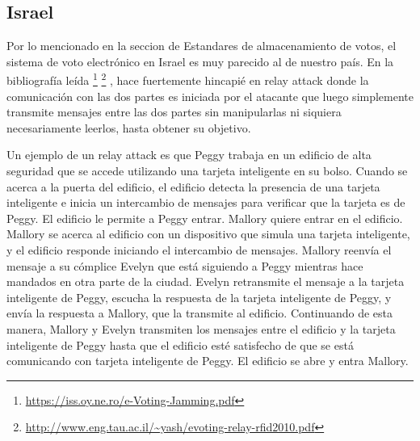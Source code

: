 \subsection{Israel}
Por lo mencionado en la seccion de Estandares de almacenamiento de votos, el sistema de voto electrónico en Israel es muy parecido al de nuestro país. 
En la bibliografía leída
\footnote{\url{https://iss.oy.ne.ro/e-Voting-Jamming.pdf}}
\footnote{\url{http://www.eng.tau.ac.il/~yash/evoting-relay-rfid2010.pdf}}
, hace fuertemente hincapié en relay attack donde la comunicación con las dos partes es iniciada por el atacante que luego simplemente transmite mensajes entre las dos partes sin manipularlas ni siquiera necesariamente leerlos, hasta obtener su objetivo.

Un ejemplo de un relay attack es que Peggy trabaja en un edificio de alta seguridad que se accede utilizando una tarjeta inteligente en su bolso. Cuando se acerca a la puerta del edificio, el edificio detecta la presencia de una tarjeta inteligente e inicia un intercambio de mensajes para verificar que la tarjeta es de Peggy. El edificio le permite a Peggy entrar. Mallory quiere entrar en el edificio. Mallory se acerca al edificio con un dispositivo que simula una tarjeta inteligente, y el edificio responde iniciando el intercambio de mensajes. Mallory reenvía el mensaje a su cómplice Evelyn que está siguiendo a Peggy mientras hace mandados en otra parte de la ciudad. Evelyn retransmite el mensaje a la tarjeta inteligente de Peggy, escucha la respuesta de la tarjeta inteligente de Peggy, y envía la respuesta a Mallory, que la transmite al edificio. Continuando de esta manera, Mallory y Evelyn transmiten los mensajes entre el edificio y la tarjeta inteligente de Peggy hasta que el edificio esté satisfecho de que se está comunicando con tarjeta inteligente de Peggy. El edificio se abre y entra Mallory.

